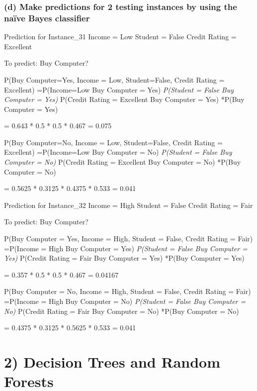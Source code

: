 \documentclass[]{article}
\begin{document}
\hypertarget{d-make-predictions-for-2-testing-instances-by-using-the-nauxefve-bayes-classifier}{%
\subsubsection{(d) Make predictions for 2 testing instances by using the
naïve Bayes
classifier}\label{d-make-predictions-for-2-testing-instances-by-using-the-nauxefve-bayes-classifier}}

Prediction for Instance\_31 Income = Low Student = False Credit Rating =
Excellent

To predict: Buy Computer?

P(Buy Computer=Yes, Income = Low, Student=False, Credit Rating =
Excellent) =P(Income=Low \textbar{} Buy Computer = Yes) \emph{P(Student
= False \textbar{} Buy Computer = Yes) }P(Credit Rating =
Excellent\textbar{} Buy Computer = Yes) *P(Buy Computer = Yes)

= 0.643 * 0.5 * 0.5 * 0.467 = 0.075

P(Buy Computer=No, Income = Low, Student=False, Credit Rating =
Excellent) =P(Income=Low \textbar{} Buy Computer = No) \emph{P(Student =
False \textbar{} Buy Computer = No) }P(Credit Rating =
Excellent\textbar{} Buy Computer = No) *P(Buy Computer = No)

= 0.5625 * 0.3125 * 0.4375 * 0.533 = 0.041

Prediction for Instance\_32 Income = High Student = False Credit Rating
= Fair

To predict: Buy Computer?

P(Buy Computer = Yes, Income = High, Student = False, Credit Rating =
Fair) =P(Income = High \textbar{} Buy Computer = Yes) \emph{P(Student =
False \textbar{} Buy Computer = Yes) }P(Credit Rating = Fair \textbar{}
Buy Computer = Yes) *P(Buy Computer = Yes)

= 0.357 * 0.5 * 0.5 * 0.467 = 0.04167

P(Buy Computer = No, Income = High, Student = False, Credit Rating =
Fair) =P(Income = High \textbar{} Buy Computer = No) \emph{P(Student =
False \textbar{} Buy Computer = No) }P(Credit Rating = Fair \textbar{}
Buy Computer = No) *P(Buy Computer = No)

= 0.4375 * 0.3125 * 0.5625 * 0.533 = 0.041

\hypertarget{decision-trees-and-random-forests}{%
\section{2) Decision Trees and Random
Forests}\label{decision-trees-and-random-forests}}
\end{document}
